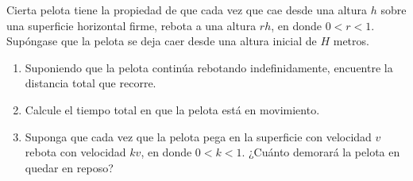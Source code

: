 \item Cierta pelota tiene la propiedad de que cada vez que cae desde una altura $h$ sobre una superficie horizontal firme, rebota a una altura $rh$, en donde $0 < r < 1$. Supóngase que la pelota se deja caer desde una altura inicial de $H$ metros.
    \begin{enumerate}
        \item Suponiendo que la pelota continúa rebotando indefinidamente, encuentre la distancia total que recorre.
        \item Calcule el tiempo total en que la pelota está en movimiento.
        \item Suponga que cada vez que la pelota pega en la superficie con velocidad $v$ rebota con velocidad $kv$, en donde $0 < k < 1$. ¿Cuánto demorará la pelota en quedar en reposo?
    \end{enumerate}
